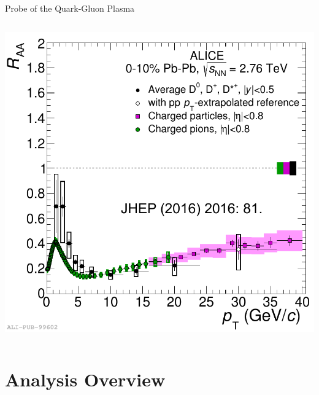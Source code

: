 \documentclass{beamer}
\begin{document}
\begin{frame}{Probe of the Quark-Gluon Plasma}
\begin{columns}
\includegraphics[width=\textwidth]{img/ALICE_DMesonRAA}
\end{columns}
\end{frame}

\section{Analysis Overview}
\end{document}
